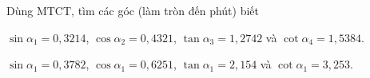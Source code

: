 \begin{bt}
	Dùng MTCT, tìm các góc (làm tròn đến phút) biết
	\begin{listEX}
	\item 
	$\sin \alpha _1 = 0{,}3214$, 
	$\cos \alpha _2 =0{,}4321$, 
	$\tan \alpha _3 = 1{,}2742$ 
	và $\cot \alpha _4 = 1{,}5384$.
	\item
	$\sin \alpha_1 = 0{,}3782$,
	$\cos \alpha_1 = 0{,}6251$,
	$\tan \alpha_1 = 2{,}154$
	và $\cot \alpha_1 = 3{,}253$.
	\end{listEX}
	\loigiai{
	}
\end{bt}

